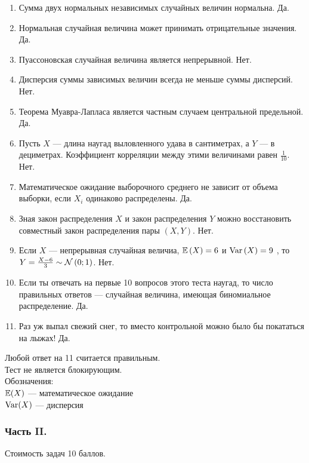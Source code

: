 \begin{enumerate}
\item Сумма двух нормальных независимых случайных величин нормальна.
Да.
\item Нормальная случайная величина может принимать отрицательные
значения. Да.
\item Пуассоновская случайная величина является непрерывной. Нет.
\item Дисперсия суммы зависимых величин всегда не меньше суммы
дисперсий. Нет.
\item Теорема Муавра-Лапласа является частным случаем центральной
предельной. Да.
\item Пусть $X$ — длина наугад выловленного удава в сантиметрах, а
$Y$ — в дециметрах. Коэффициент корреляции между этими
величинами равен $\frac{1}{10}$. Нет.
\item Математическое ожидание выборочного среднего не зависит от
объема выборки, если $X_{i}$ одинаково распределены. Да.
\item Зная закон распределения $X$ и закон распределения $Y$
можно восстановить совместный закон распределения пары $(X,Y)$. Нет.
\item Если  $X$  — непрерывная случайная величиа,  $\mathbb{E}\left(X\right)=6$  и
$\operatorname{Var}\left(X\right)=9$ , то  $Y=\frac{X-6}{3} \sim
\mathcal{N}\left(0;1\right)$.  Нет.
\item Если ты отвечать на первые 10 вопросов этого теста наугад, то
число правильных ответов — случайная величина, имеющая
биномиальное распределение. Да.
\item Раз уж выпал свежий снег, то вместо контрольной можно
было бы покататься на лыжах! Да.
\end{enumerate}

Любой ответ на 11 считается правильным. \\
Тест не является блокирующим. \\
Обозначения: \\
$\mathbb{E}(X)$ — математическое ожидание \\
$\operatorname{Var}(X)$ — дисперсия

\subsubsection*{Часть II.}

Стоимость задач 10 баллов.

